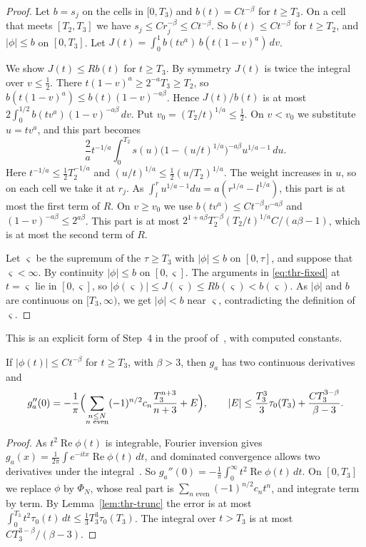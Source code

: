 \begin{proof}
Let $b=s_j$ on the cells in $[0,T_3)$ and $b(t)=Ct^{-\beta}$ for $t\ge T_3$.
On a cell that meets $[T_2,T_3]$ we have $s_j\le Cr_j^{-\beta}\le Ct^{-\beta}$.
So $b(t)\le Ct^{-\beta}$ for $t\ge T_2$, and $\lvert\phi\rvert\le b$ on
$[0,T_3]$. Let $J(t)=\int_0^1b(tv^a)\,b(t(1-v)^a)\,dv$.

We show $J(t)\le Rb(t)$ for $t\ge T_3$. By symmetry $J(t)$ is twice the
integral over $v\le\frac12$. There $t(1-v)^a\ge2^{-a}T_3\ge T_2$, so
$b(t(1-v)^a)\le b(t)(1-v)^{-a\beta}$. Hence $J(t)/b(t)$ is at most
$2\int_0^{1/2}b(tv^a)(1-v)^{-a\beta}\,dv$. Put $v_0=(T_2/t)^{1/a}\le\frac12$.
On $v<v_0$ we substitute $u=tv^a$, and this part becomes
\[
 \frac2at^{-1/a}\int_0^{T_2}s(u)\bigl(1-(u/t)^{1/a}\bigr)^{-a\beta}
 u^{1/a-1}\,du .
\]
Here $t^{-1/a}\le\frac12T_2^{-1/a}$ and $(u/t)^{1/a}\le\frac12(u/T_2)^{1/a}$.
The weight increases in $u$, so on each cell we take it at $r_j$. As
$\int_l^ru^{1/a-1}du=a(r^{1/a}-l^{1/a})$, this part is at most the first term
of $R$. On $v\ge v_0$ we use $b(tv^a)\le Ct^{-\beta}v^{-a\beta}$ and
$(1-v)^{-a\beta}\le2^{a\beta}$. This part is at most
$2^{1+a\beta}T_2^{-\beta}(T_2/t)^{1/a}C/(a\beta-1)$, which is at most the
second term of $R$.

Let $\varsigma$ be the supremum of the $\tau\ge T_3$ with
$\lvert\phi\rvert\le b$ on $[0,\tau]$, and suppose that $\varsigma<\infty$. By
continuity $\lvert\phi\rvert\le b$ on $[0,\varsigma]$. The arguments in
\eqref{eq:thr-fixed} at $t=\varsigma$ lie in $[0,\varsigma]$, so
$\lvert\phi(\varsigma)\rvert\le J(\varsigma)\le Rb(\varsigma)<b(\varsigma)$.
As $\lvert\phi\rvert$ and $b$ are continuous on $[T_3,\infty)$, we get
$\lvert\phi\rvert<b$ near $\varsigma$, contradicting the definition of $\varsigma$.
\end{proof}

This is an explicit form of Step~4 in the proof of~\cite[Theorem~2.5]{glr2026},
with computed constants.

\begin{lemma}\label{lem:thr-fpp}
If $\lvert\phi(t)\rvert\le Ct^{-\beta}$ for $t\ge T_3$, with $\beta>3$, then
$g_a$ has two continuous derivatives and
\[
 g_a''(0)=-\frac1\pi\Bigl(\sum_{\substack{n\le N\\ n\text{ even}}}
 (-1)^{n/2}c_n\frac{T_3^{n+3}}{n+3}+E\Bigr),\qquad
 \lvert E\rvert\le\frac{T_3^3}3\tau_0(T_3)+\frac{CT_3^{3-\beta}}{\beta-3} .
\]
\end{lemma}

\begin{proof}
As $t^2\operatorname{Re}\phi(t)$ is integrable, Fourier inversion gives
$g_a(x)=\frac1{2\pi}\int e^{-itx}\operatorname{Re}\phi(t)\,dt$, and dominated
convergence allows two derivatives under the
integral~\cite[Section~3.3]{durrett2019}. So
$g_a''(0)=-\frac1\pi\int_0^\infty t^2\operatorname{Re}\phi(t)\,dt$. On
$[0,T_3]$ we replace $\phi$ by $\Phi_N$, whose real part is
$\sum_{n\text{ even}}(-1)^{n/2}c_nt^n$, and integrate term by term. By
Lemma~\ref{lem:thr-trunc} the error is at most
$\int_0^{T_3}t^2\tau_0(t)\,dt\le\frac13T_3^3\tau_0(T_3)$. The integral over
$t>T_3$ is at most $CT_3^{3-\beta}/(\beta-3)$.
\end{proof}

